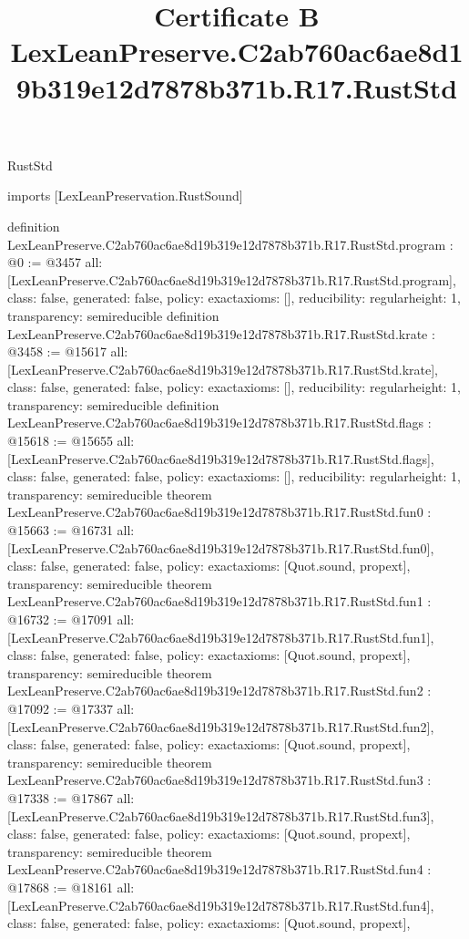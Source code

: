 \begin{lexlean}{RustStd}
\title{Certificate B LexLeanPreserve.C2ab760ac6ae8d19b319e12d7878b371b.R17.RustStd}
\begin{coremodule}
imports [LexLeanPreservation.RustSound]

definition LexLeanPreserve.C2ab760ac6ae8d19b319e12d7878b371b.R17.RustStd.program : @0 := @3457 {
  all: [LexLeanPreserve.C2ab760ac6ae8d19b319e12d7878b371b.R17.RustStd.program],
  class: false,
  generated: false,
  policy: exact{axioms: []},
  reducibility: regular{height: 1},
  transparency: semireducible
}
definition LexLeanPreserve.C2ab760ac6ae8d19b319e12d7878b371b.R17.RustStd.krate : @3458 := @15617 {
  all: [LexLeanPreserve.C2ab760ac6ae8d19b319e12d7878b371b.R17.RustStd.krate],
  class: false,
  generated: false,
  policy: exact{axioms: []},
  reducibility: regular{height: 1},
  transparency: semireducible
}
definition LexLeanPreserve.C2ab760ac6ae8d19b319e12d7878b371b.R17.RustStd.flags : @15618 := @15655 {
  all: [LexLeanPreserve.C2ab760ac6ae8d19b319e12d7878b371b.R17.RustStd.flags],
  class: false,
  generated: false,
  policy: exact{axioms: []},
  reducibility: regular{height: 1},
  transparency: semireducible
}
theorem LexLeanPreserve.C2ab760ac6ae8d19b319e12d7878b371b.R17.RustStd.fun0 : @15663 := @16731 {
  all: [LexLeanPreserve.C2ab760ac6ae8d19b319e12d7878b371b.R17.RustStd.fun0],
  class: false,
  generated: false,
  policy: exact{axioms: [Quot.sound, propext]},
  transparency: semireducible
}
theorem LexLeanPreserve.C2ab760ac6ae8d19b319e12d7878b371b.R17.RustStd.fun1 : @16732 := @17091 {
  all: [LexLeanPreserve.C2ab760ac6ae8d19b319e12d7878b371b.R17.RustStd.fun1],
  class: false,
  generated: false,
  policy: exact{axioms: [Quot.sound, propext]},
  transparency: semireducible
}
theorem LexLeanPreserve.C2ab760ac6ae8d19b319e12d7878b371b.R17.RustStd.fun2 : @17092 := @17337 {
  all: [LexLeanPreserve.C2ab760ac6ae8d19b319e12d7878b371b.R17.RustStd.fun2],
  class: false,
  generated: false,
  policy: exact{axioms: [Quot.sound, propext]},
  transparency: semireducible
}
theorem LexLeanPreserve.C2ab760ac6ae8d19b319e12d7878b371b.R17.RustStd.fun3 : @17338 := @17867 {
  all: [LexLeanPreserve.C2ab760ac6ae8d19b319e12d7878b371b.R17.RustStd.fun3],
  class: false,
  generated: false,
  policy: exact{axioms: [Quot.sound, propext]},
  transparency: semireducible
}
theorem LexLeanPreserve.C2ab760ac6ae8d19b319e12d7878b371b.R17.RustStd.fun4 : @17868 := @18161 {
  all: [LexLeanPreserve.C2ab760ac6ae8d19b319e12d7878b371b.R17.RustStd.fun4],
  class: false,
  generated: false,
  policy: exact{axioms: [Quot.sound, propext]},
}
\end{coremodule}
\end{lexlean}
